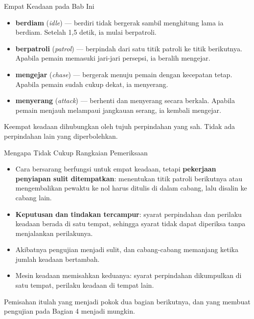 \documentclass[aspectratio=169,10pt]{beamer}
\begin{document}
\begin{frame}{Empat Keadaan pada Bab Ini}
\begin{itemize}
  \item \textbf{berdiam} (\emph{idle}) --- berdiri tidak bergerak sambil
        menghitung lama ia berdiam. Setelah 1,5 detik, ia mulai berpatroli.
  \item \textbf{berpatroli} (\emph{patrol}) --- berpindah dari satu titik
        patroli ke titik berikutnya. Apabila pemain memasuki jari-jari persepsi,
        ia beralih mengejar.
  \item \textbf{mengejar} (\emph{chase}) --- bergerak menuju pemain dengan
        kecepatan tetap. Apabila pemain sudah cukup dekat, ia menyerang.
  \item \textbf{menyerang} (\emph{attack}) --- berhenti dan menyerang secara
        berkala. Apabila pemain menjauh melampaui jangkauan serang, ia kembali
        mengejar.
\end{itemize}
\vspace{0.14cm}
\begin{kotak}
Keempat keadaan dihubungkan oleh tujuh perpindahan yang sah. Tidak ada
perpindahan lain yang diperbolehkan.
\end{kotak}
\end{frame}

\begin{frame}{Mengapa Tidak Cukup Rangkaian Pemeriksaan}
\begin{itemize}
  \item Cara bersarang berfungsi untuk empat keadaan, tetapi
        \textbf{pekerjaan penyiapan sulit ditempatkan}: menentukan titik
        patroli berikutnya atau mengembalikan pewaktu ke nol harus ditulis di
        dalam cabang, lalu disalin ke cabang lain.
  \item \textbf{Keputusan dan tindakan tercampur}: syarat perpindahan dan
        perilaku keadaan berada di satu tempat, sehingga syarat tidak dapat
        diperiksa tanpa menjalankan perilakunya.
  \item Akibatnya pengujian menjadi sulit, dan cabang-cabang memanjang ketika
        jumlah keadaan bertambah.
  \item Mesin keadaan memisahkan keduanya: syarat perpindahan dikumpulkan di
        satu tempat, perilaku keadaan di tempat lain.
\end{itemize}
\vspace{0.12cm}
\begin{kotak}
Pemisahan itulah yang menjadi pokok dua bagian berikutnya, dan yang membuat
pengujian pada Bagian 4 menjadi mungkin.
\end{kotak}
\end{frame}
\end{document}
